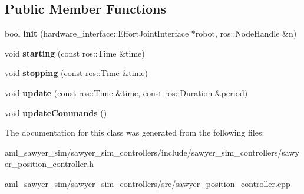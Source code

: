 \subsection*{Public Member Functions}
\begin{DoxyCompactItemize}
\item 
\hypertarget{classsawyer__sim__controllers_1_1_sawyer_position_controller_a2f07af733064e12846b9be314041757e}{bool {\bfseries init} (hardware\-\_\-interface\-::\-Effort\-Joint\-Interface $\ast$robot, ros\-::\-Node\-Handle \&n)}\label{classsawyer__sim__controllers_1_1_sawyer_position_controller_a2f07af733064e12846b9be314041757e}

\item 
\hypertarget{classsawyer__sim__controllers_1_1_sawyer_position_controller_a19bea4acea265b2218c3475281e1f6dd}{void {\bfseries starting} (const ros\-::\-Time \&time)}\label{classsawyer__sim__controllers_1_1_sawyer_position_controller_a19bea4acea265b2218c3475281e1f6dd}

\item 
\hypertarget{classsawyer__sim__controllers_1_1_sawyer_position_controller_af72589a77cb2690a9e204aaf505473a2}{void {\bfseries stopping} (const ros\-::\-Time \&time)}\label{classsawyer__sim__controllers_1_1_sawyer_position_controller_af72589a77cb2690a9e204aaf505473a2}

\item 
\hypertarget{classsawyer__sim__controllers_1_1_sawyer_position_controller_aa0d376751467854c14ee4ff0de1e5cba}{void {\bfseries update} (const ros\-::\-Time \&time, const ros\-::\-Duration \&period)}\label{classsawyer__sim__controllers_1_1_sawyer_position_controller_aa0d376751467854c14ee4ff0de1e5cba}

\item 
\hypertarget{classsawyer__sim__controllers_1_1_sawyer_position_controller_a99418287a304afab8a03965c4cf4eb2b}{void {\bfseries update\-Commands} ()}\label{classsawyer__sim__controllers_1_1_sawyer_position_controller_a99418287a304afab8a03965c4cf4eb2b}

\end{DoxyCompactItemize}


The documentation for this class was generated from the following files\-:\begin{DoxyCompactItemize}
\item 
aml\-\_\-sawyer\-\_\-sim/sawyer\-\_\-sim\-\_\-controllers/include/sawyer\-\_\-sim\-\_\-controllers/sawyer\-\_\-position\-\_\-controller.\-h\item 
aml\-\_\-sawyer\-\_\-sim/sawyer\-\_\-sim\-\_\-controllers/src/sawyer\-\_\-position\-\_\-controller.\-cpp\end{DoxyCompactItemize}
